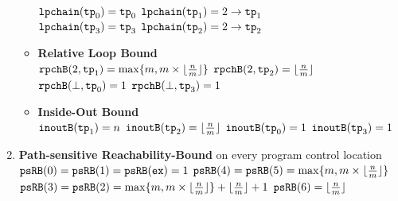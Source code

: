 \begin{enumerate}
\begin{itemize}
  $\mathtt{lpchain}(\mathtt{tp}_0) = \mathtt{tp}_0$ \qquad
  $\mathtt{lpchain}(\mathtt{tp}_1) = 2\to \mathtt{tp}_1$ \\
  $\mathtt{lpchain}(\mathtt{tp}_3) = \mathtt{tp}_3$ \qquad
  $\mathtt{lpchain}(\mathtt{tp}_2) = 2\to \mathtt{tp}_2$ 
  \item \textbf{{Relative Loop Bound}}
  \\
  $\mathtt{rpchB}(2, \mathtt{tp}_1) = \max\{m, m \times \lfloor\frac{n}{m}\rfloor\}$ \quad
  $\mathtt{rpchB}(2, \mathtt{tp}_2) = \lfloor\frac{n}{m}\rfloor$  \\
  $\mathtt{rpchB}(\bot, \mathtt{tp}_0) = 1$ \quad
  $\mathtt{rpchB}(\bot, \mathtt{tp}_3) = 1$ 
  \item \textbf{Inside-Out Bound}
  \\
  $\mathtt{inoutB}(\mathtt{tp}_1) = n$ \quad
  $\mathtt{inoutB}(\mathtt{tp}_2) = \lfloor\frac{n}{m}\rfloor$ \quad
  $\mathtt{inoutB}(\mathtt{tp}_0) = 1$ \quad
  $\mathtt{inoutB}(\mathtt{tp}_3) = 1$ 
\end{itemize}
\item \textbf{Path-sensitive Reachability-Bound} on every program control location
\\
$\mathtt{psRB}(0) = \mathtt{psRB}(1) = \mathtt{psRB}(\mathtt{ex}) = 1$ \qquad
$\mathtt{psRB}(4) = \mathtt{psRB}(5) = \max\{m, m \times \lfloor\frac{n}{m}\rfloor\}$ 
\\
$\mathtt{psRB}(3) = \mathtt{psRB}(2) = \max\{m, m \times \lfloor\frac{n}{m}\rfloor\} + \lfloor\frac{n}{m}\rfloor + 1 $
\quad $\mathtt{psRB}(6) = \lfloor\frac{n}{m}\rfloor$ 
\end{enumerate}